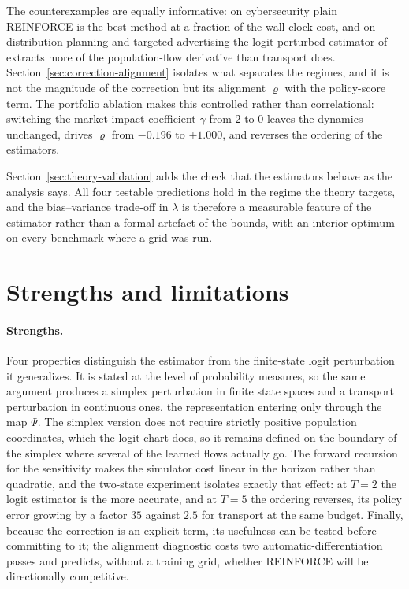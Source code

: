 The counterexamples are equally informative: on cybersecurity plain REINFORCE is the best method at a fraction of the wall-clock cost, and on distribution planning and targeted advertising the logit-perturbed estimator of \cite{meunier2026model} extracts more of the population-flow derivative than transport does. Section~\ref{sec:correction-alignment} isolates what separates the regimes, and it is not the magnitude of the correction but its alignment $\varrho$ with the policy-score term. The portfolio ablation makes this controlled rather than correlational: switching the market-impact coefficient $\gamma$ from $2$ to $0$ leaves the dynamics unchanged, drives $\varrho$ from $-0.196$ to $+1.000$, and reverses the ordering of the estimators.

Section~\ref{sec:theory-validation} adds the check that the estimators behave as the analysis says. All four testable predictions hold in the regime the theory targets, and the bias--variance trade-off in $\lambda$ is therefore a measurable feature of the estimator rather than a formal artefact of the bounds, with an interior optimum on every benchmark where a grid was run.

\section{Strengths and limitations}
\label{sec:strengths-limitations}

\paragraph{Strengths.}
Four properties distinguish the estimator from the finite-state logit perturbation it generalizes. It is stated at the level of probability measures, so the same argument produces a simplex perturbation in finite state spaces and a transport perturbation in continuous ones, the representation entering only through the map $\Psi$. The simplex version does not require strictly positive population coordinates, which the logit chart does, so it remains defined on the boundary of the simplex where several of the learned flows actually go. The forward recursion for the sensitivity makes the simulator cost linear in the horizon rather than quadratic, and the two-state experiment isolates exactly that effect: at $T=2$ the logit estimator is the more accurate, and at $T=5$ the ordering reverses, its policy error growing by a factor $35$ against $2.5$ for transport at the same budget. Finally, because the correction is an explicit term, its usefulness can be tested before committing to it; the alignment diagnostic costs two automatic-differentiation passes and predicts, without a training grid, whether REINFORCE will be directionally competitive.

